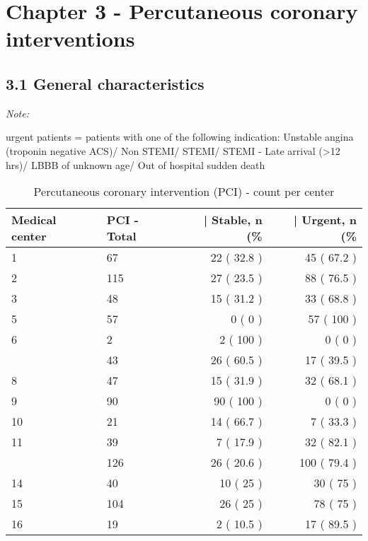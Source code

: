 \documentclass[
]{article}
\begin{document}
\hypertarget{chapter-3---percutaneous-coronary-interventions}{%
\section{Chapter 3 - Percutaneous coronary
interventions}\label{chapter-3---percutaneous-coronary-interventions}}

\hypertarget{general-characteristics}{%
\subsection{3.1 General characteristics}\label{general-characteristics}}

\begin{ThreePartTable}
\begin{TableNotes}
\item \textit{Note: } 
\item urgent patients = patients with one of the following indication: Unstable angina (troponin negative ACS)/ Non STEMI/ STEMI/ STEMI - Late arrival (>12 hrs)/ LBBB of unknown age/ Out of hospital sudden death
\end{TableNotes}
\begin{longtable}[t]{llrr}
\caption{\label{tab:table 25}Percutaneous coronary intervention (PCI) - count per center}\\
\toprule
Medical center & PCI    - Total & | Stable, n (\% & | Urgent, n (\%\\
\midrule
1 & 67 & 22 ( 32.8 ) & 45 ( 67.2 )\\
2 & 115 & 27 ( 23.5 ) & 88 ( 76.5 )\\
3 & 48 & 15 ( 31.2 ) & 33 ( 68.8 )\\
5 & 57 & 0 ( 0 ) & 57 ( 100 )\\
6 & 2 & 2 ( 100 ) & 0 ( 0 )\\
\addlinespace
7 & 43 & 26 ( 60.5 ) & 17 ( 39.5 )\\
8 & 47 & 15 ( 31.9 ) & 32 ( 68.1 )\\
9 & 90 & 90 ( 100 ) & 0 ( 0 )\\
10 & 21 & 14 ( 66.7 ) & 7 ( 33.3 )\\
11 & 39 & 7 ( 17.9 ) & 32 ( 82.1 )\\
\addlinespace
12 & 126 & 26 ( 20.6 ) & 100 ( 79.4 )\\
14 & 40 & 10 ( 25 ) & 30 ( 75 )\\
15 & 104 & 26 ( 25 ) & 78 ( 75 )\\
16 & 19 & 2 ( 10.5 ) & 17 ( 89.5 )\\

\end{longtable}
\end{ThreePartTable}
\end{document}
